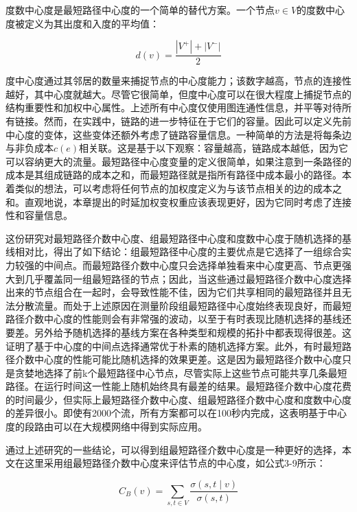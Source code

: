 度数中心度是最短路径中心度的一个简单的替代方案。一个节点$v \in V$的度数中心度被定义为其出度和入度的平均值：

\begin{equation} \label{degrees of centre}
    d(v)=\frac{|V^+|+|V^-|}{2}
\end{equation}

度中心度通过其邻居的数量来捕捉节点的中心度能力；该数字越高，节点的连接性越好，其中心度就越大。尽管它很简单，但度中心度可以在很大程度上捕捉节点的结构重要性和加权中心属性。上述所有中心度仅使用图连通性信息，并平等对待所有链接。然而，在实践中，链路的进一步特征在于它们的容量。因此可以定义先前中心度的变体，这些变体还额外考虑了链路容量信息。一种简单的方法是将每条边与非负成本$c(e)$相关联。这是基于以下观察：容量越高，链路成本越低，因为它可以容纳更大的流量。最短路径中心度变量的定义很简单，如果注意到一条路径的成本是其组成链路的成本之和，而最短路径就是指所有路径中成本最小的路径。本着类似的想法，可以考虑将任何节点的加权度定义为与该节点相关的边的成本之和。直观地说，本章提出的时延加权变权重应该表现更好，因为它同时考虑了连接性和容量信息。

这份研究对最短路径介数中心度、组最短路径中心度和度数中心度于随机选择的基线相对比，得出了如下结论：组最短路径中心度的主要优点是它选择了一组综合实力较强的中间点。而最短路径介数中心度只会选择单独看来中心度更高、节点更强大到几乎覆盖同一组最短路径的节点；因此，当这些通过最短路径介数中心度选择出来的节点组合在一起时，会导致性能不佳，因为它们共享相同的最短路径并且无法分散流量。而处于上述原因在测量阶段组最短路径中心度始终表现良好，而最短路径介数中心度的性能则会有非常强的波动，以至于有时表现比随机选择的基线还要差。另外给予随机选择的基线方案在各种类型和规模的拓扑中都表现得很差。这证明了基于中心度的中间点选择通常优于朴素的随机选择方案。此外，有时最短路径介数中心度的性能可能比随机选择的效果更差。这是因为最短路径介数中心度只是贪婪地选择了前k个最短路径中心节点，尽管实际上这些节点可能共享几条最短路径。在运行时间这一性能上随机始终具有最差的结果。最短路径介数中心度花费的时间最少，但实际上最短路径介数中心度、组最短路径介数中心度和度数中心度的差异很小。即使有2000个流，所有方案都可以在100秒内完成，这表明基于中心度的段路由可以在大规模网络中得到实际应用。

通过上述研究的一些结论，可以得到组最短路径介数中心度是一种更好的选择，本文在这里采用组最短路径介数中心度来评估节点的中心度，如公式3-9所示：

\begin{equation} \label{node centrality}
    C_B\left(v\right)=\sum_{s,t\in V}\frac{\sigma\left(s,t\middle| v\right)}{\sigma(s,t)}
\end{equation}

